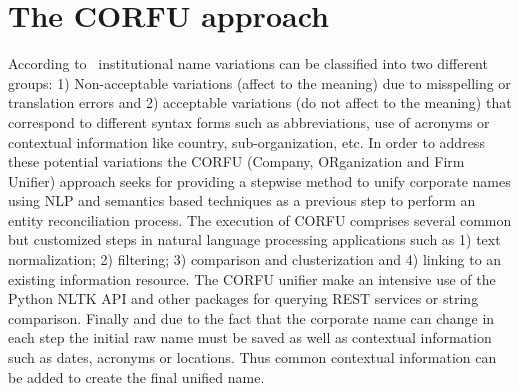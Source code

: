 \documentclass{llncs}
\begin{document}
 \section{The CORFU approach}
According to~\cite{Galvez2006,Morillo:2013:TAA:2424697.2424727} institutional name variations can be 
classified into two different groups: 1) Non-acceptable variations (affect to the meaning) due to misspelling or translation errors and 
2) acceptable variations (do not affect to the meaning) that correspond to different syntax forms such as abbreviations, use of acronyms or contextual 
information like country, sub-organization, etc. In order to address these potential variations the CORFU (Company, ORganization and Firm Unifier) approach 
seeks for providing a stepwise method to unify corporate names using NLP and semantics based techniques as a previous step to perform 
an entity reconciliation process. The execution of CORFU comprises several common but customized steps in natural language processing applications such as 
1) text normalization; 2) filtering; 3) comparison and clusterization and 4) linking to an existing information resource. The CORFU unifier 
make an intensive use of the Python NLTK API and other packages for querying REST services or string comparison. Finally and 
due to the fact that the corporate name can change in each step the initial raw name must be saved as well as contextual information such as dates, acronyms or locations. 
Thus common contextual information can be added to create the final unified name.
\end{document}
